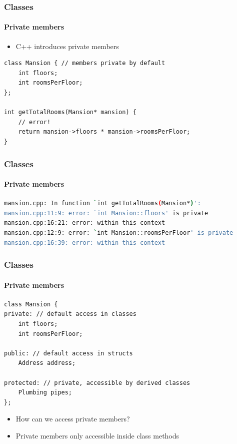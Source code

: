 \documentclass[table]{beamer}
\newcommand{\declarelesson}{\textbf{\color{themegreen}{Lesson:}} }
\begin{document}

\begin{frame}[fragile]
    \frametitle{\declarelesson Classes }
    \framesubtitle{Private members}
    \begin{itemize}
        \item C++ introduces private members
    \end{itemize}
    \begin{lstlisting}[title=Functions cannot access members]
class Mansion { // members private by default
    int floors;
    int roomsPerFloor;
};

int getTotalRooms(Mansion* mansion) {
    // error!
    return mansion->floors * mansion->roomsPerFloor;
}
    \end{lstlisting}
\end{frame}

\begin{frame}[fragile]
    \frametitle{\declarelesson Classes }
    \framesubtitle{Private members}
    \begin{lstlisting}[title=Compilation errors,basicstyle=\scriptsize\ttfamily\color{codefg},language=bash]
mansion.cpp: In function `int getTotalRooms(Mansion*)':
mansion.cpp:11:9: error: `int Mansion::floors' is private
mansion.cpp:16:21: error: within this context
mansion.cpp:12:9: error: `int Mansion::roomsPerFloor' is private
mansion.cpp:16:39: error: within this context
    \end{lstlisting}
\end{frame}


\begin{frame}[fragile]
    \frametitle{\declarelesson Classes }
    \framesubtitle{Private members}
    \begin{lstlisting}[title=Keywords for defining member access]
class Mansion {
private: // default access in classes
    int floors;
    int roomsPerFloor;

public: // default access in structs
    Address address;

protected: // private, accessible by derived classes
    Plumbing pipes;
};
    \end{lstlisting}
    \begin{itemize}
        \item How can we access private members?
        \item Private members only accessible inside class methods
    \end{itemize}
\end{frame}
\end{document}
